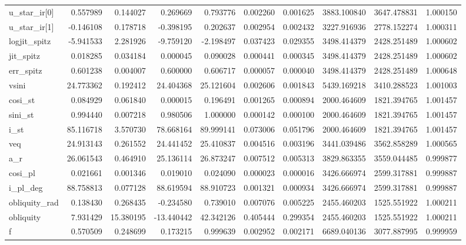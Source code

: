\begin{tabular}{lrrrrrrrrr}
u\_star\_ir[0]  &   0.557989 &   0.144027 &   0.269669 &    0.793776 &   0.002260 &  0.001625 &  3883.100840 &  3647.478831 &  1.000150 \\
u\_star\_ir[1]  &  -0.146108 &   0.178718 &  -0.398195 &    0.202637 &   0.002954 &  0.002432 &  3227.916936 &  2778.152274 &  1.000311 \\
logjit\_spitz  &  -5.941533 &   2.281926 &  -9.759120 &   -2.198497 &   0.037423 &  0.029355 &  3498.414379 &  2428.251489 &  1.000602 \\
jit\_spitz     &   0.018285 &   0.034184 &   0.000045 &    0.090028 &   0.000441 &  0.000345 &  3498.414379 &  2428.251489 &  1.000602 \\
err\_spitz     &   0.601238 &   0.004007 &   0.600000 &    0.606717 &   0.000057 &  0.000040 &  3498.414379 &  2428.251489 &  1.000648 \\
vsini         &  24.773362 &   0.192412 &  24.404368 &   25.121604 &   0.002606 &  0.001843 &  5439.169218 &  3410.288523 &  1.001003 \\
cosi\_st       &   0.084929 &   0.061840 &   0.000015 &    0.196491 &   0.001265 &  0.000894 &  2000.464609 &  1821.394765 &  1.001457 \\
sini\_st       &   0.994440 &   0.007218 &   0.980506 &    1.000000 &   0.000142 &  0.000100 &  2000.464609 &  1821.394765 &  1.001457 \\
i\_st          &  85.116718 &   3.570730 &  78.668164 &   89.999141 &   0.073006 &  0.051796 &  2000.464609 &  1821.394765 &  1.001457 \\
veq           &  24.913143 &   0.261552 &  24.441452 &   25.410837 &   0.004516 &  0.003196 &  3441.039486 &  3562.858289 &  1.000565 \\
a\_r           &  26.061543 &   0.464910 &  25.136114 &   26.873247 &   0.007512 &  0.005313 &  3829.863355 &  3559.044485 &  0.999877 \\
cosi\_pl       &   0.021661 &   0.001346 &   0.019010 &    0.024090 &   0.000023 &  0.000016 &  3426.666974 &  2599.317881 &  0.999887 \\
i\_pl\_deg      &  88.758813 &   0.077128 &  88.619594 &   88.910723 &   0.001321 &  0.000934 &  3426.666974 &  2599.317881 &  0.999887 \\
obliquity\_rad &   0.138430 &   0.268435 &  -0.234580 &    0.739010 &   0.007076 &  0.005225 &  2455.460203 &  1525.551922 &  1.000211 \\
obliquity     &   7.931429 &  15.380195 & -13.440442 &   42.342126 &   0.405444 &  0.299354 &  2455.460203 &  1525.551922 &  1.000211 \\
f             &   0.570509 &   0.248699 &   0.173215 &    0.999639 &   0.002952 &  0.002171 &  6689.040136 &  3077.887995 &  0.999959 \\
\bottomrule
\end{tabular}
